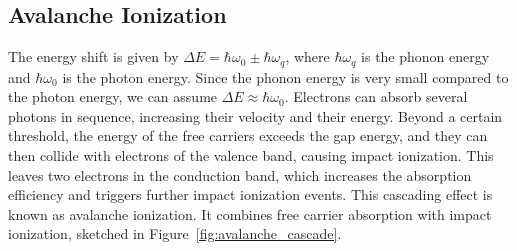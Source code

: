 \subsection{Avalanche Ionization}
\label{sec:avalanche}

The energy shift is given by $\Delta E = \hbar\omega_0 \pm \hbar\omega_q$, where $\hbar\omega_q$ is the phonon energy and $\hbar\omega_0$ is the photon energy. Since the phonon energy is very small compared to the photon energy, we can assume $\Delta E \approx \hbar\omega_0$. Electrons can absorb several photons in sequence, increasing their velocity and their energy. Beyond a certain threshold, the energy of the free carriers exceeds the gap energy, and they can then collide with electrons of the valence band, causing impact ionization. This leaves two electrons in the conduction band, which increases the absorption efficiency and triggers further impact ionization events. This cascading effect is known as avalanche ionization. It combines free carrier absorption with impact ionization, sketched in Figure~\ref{fig:avalanche_cascade}.

